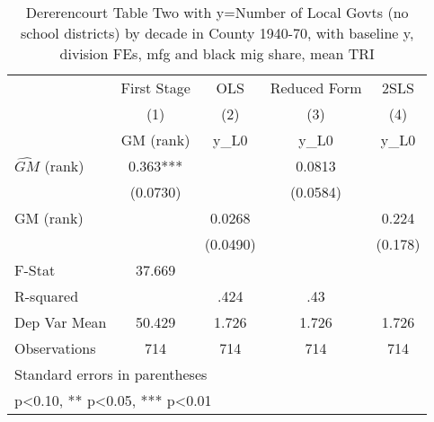 \begin{table}[htbp]\centering
\def\sym#1{\ifmmode^{#1}\else\(^{#1}\)\fi}
\caption{Dererencourt Table Two with y=Number of Local Govts (no school districts) by decade in County 1940-70, with baseline y, division FEs, mfg and black mig share, mean TRI}
\begin{tabular}{l*{4}{c}}
\toprule
                    & First Stage   &         OLS   &Reduced Form   &        2SLS   \\
                    &\multicolumn{1}{c}{(1)}&\multicolumn{1}{c}{(2)}&\multicolumn{1}{c}{(3)}&\multicolumn{1}{c}{(4)}\\
                    &\multicolumn{1}{c}{GM  (rank)}&\multicolumn{1}{c}{y\_L0}&\multicolumn{1}{c}{y\_L0}&\multicolumn{1}{c}{y\_L0}\\
\midrule
$\hat{GM}$ (rank)   &       0.363***&               &      0.0813   &               \\
                    &    (0.0730)   &               &    (0.0584)   &               \\
\addlinespace
GM  (rank)          &               &      0.0268   &               &       0.224   \\
                    &               &    (0.0490)   &               &     (0.178)   \\
\midrule
F-Stat              &      37.669   &               &               &               \\
R-squared           &               &        .424   &         .43   &               \\
Dep Var Mean        &      50.429   &       1.726   &       1.726   &       1.726   \\
Observations        &         714   &         714   &         714   &         714   \\
\bottomrule
\multicolumn{5}{l}{\footnotesize Standard errors in parentheses}\\
\multicolumn{5}{l}{\footnotesize * p<0.10, ** p<0.05, *** p<0.01}\\
\end{tabular}
\end{table}
